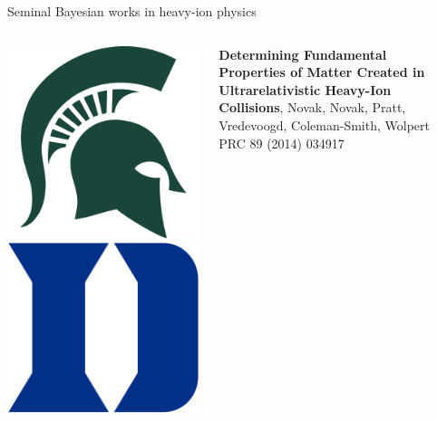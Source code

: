 \documentclass{beamer}
\begin{document}
\begin{frame}{Seminal Bayesian works in heavy-ion physics}
\begin{columns}[T]
\begin{column}{0.05\textwidth}
      \raggedleft
      \includegraphics[width=\columnwidth]{michigan-state}\\
      \includegraphics[width=.8\columnwidth]{duke}
    \end{column}
    \begin{column}{0.9\textwidth}
      \scriptsize {}
      \textbf{Determining Fundamental Properties of Matter Created in Ultrarelativistic Heavy-Ion Collisions}, Novak, Novak, Pratt, Vredevoogd, Coleman-Smith, Wolpert
      PRC 89 (2014) 034917
    \end{column}
    \begin{column}{0.025\textwidth}
    \end{column}
  \end{columns}
\end{frame}
\end{document}

